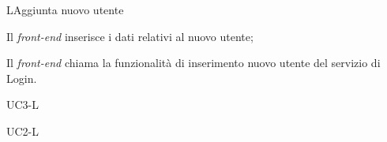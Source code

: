 \begin{usecase}{1}{L}{Aggiunta nuovo utente}
	
	
	
	\begin{ucscenarioprincipale}
		\item Il \textit{front-end} inserisce i dati relativi al nuovo utente;
		\item Il \textit{front-end} chiama la funzionalità di inserimento nuovo utente del servizio di Login.
	\end{ucscenarioprincipale}


	\begin{ucestensioni}
		\item UC3-L
	\end{ucestensioni}

	\begin{ucgeneralizzazioni}
		\item UC2-L
	\end{ucgeneralizzazioni}

	\label{uc:aggiunta-utente-l}
\end{usecase}

